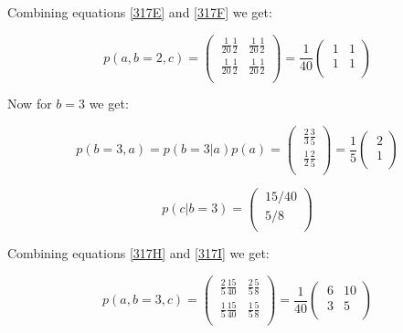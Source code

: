 \documentclass[11pt,a4paper,oneside]{report}
\begin{document}
Combining equations \eqref{317E} and \eqref{317F} we get:

\begin{equation}
\label{317G}
p(a, b = 2, c) =  
  \begin{pmatrix}
   \ \frac{1}{20} \frac{1}{2} & \frac{1}{20} \frac{1}{2} \\[0.4em]
   \ \frac{1}{20} \frac{1}{2} & \frac{1}{20} \frac{1}{2} \\
 \end{pmatrix} = \frac{1}{40}
  \begin{pmatrix}
   \ 1 & 1 \\[0.4em]
   \ 1 & 1 \\
 \end{pmatrix} 
\end{equation}


Now for $b = 3$ we get:

\begin{equation}
\label{317H}
    p(b = 3, a) = p(b = 3|a) p(a) = 
    \begin{pmatrix}
      \ \frac{2}{3} \frac{3}{5} \\[0.4em]
      \ \frac{1}{2} \frac{2}{5} \\
    \end{pmatrix} = \frac{1}{5}
    \begin{pmatrix}
      \ 2 \\[0.4em]
      \ 1 \\
    \end{pmatrix}
\end{equation}

\begin{equation}
\label{317I}
p(c | b = 3) =  
  \begin{pmatrix}
   \ 15/40 \\[0.4em]
   \ 5/8 \\
 \end{pmatrix} 
\end{equation}

Combining equations \eqref{317H} and \eqref{317I} we get:

\begin{equation}
\label{317J}
p(a, b = 3, c) =  
  \begin{pmatrix}
   \ \frac{2}{5} \frac{15}{40} & \frac{2}{5} \frac{5}{8} \\[0.4em]
   \ \frac{1}{5} \frac{15}{40} & \frac{1}{5} \frac{5}{8} \\
 \end{pmatrix} = \frac{1}{40}
  \begin{pmatrix}
   \ 6 & 10 \\[0.4em]
   \ 3 & 5 \\
 \end{pmatrix} 
\end{equation}
\end{document}
